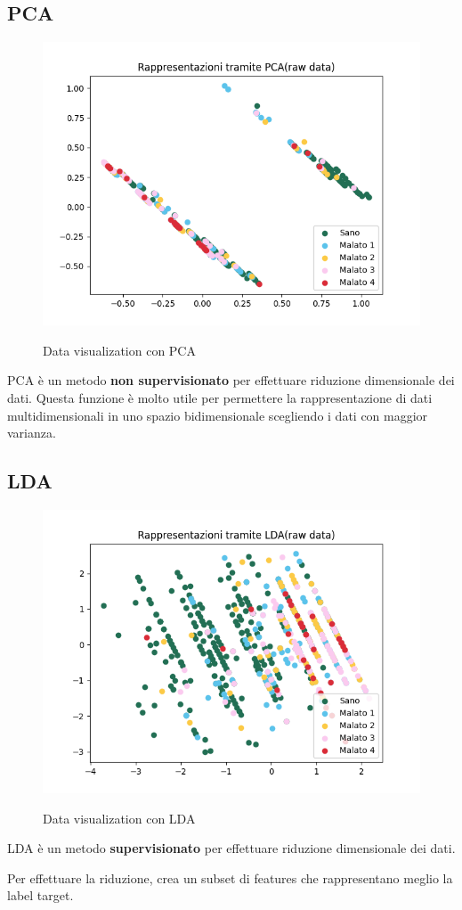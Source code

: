 \documentclass[a4paper]{article}
\begin{document}
    
    \clearpage
    
    \subsection{PCA}
    

    \begin{figure}[h!]
        \centering
            \includegraphics[width=0.5\linewidth]{imgs/pca.png}
        \label{fig:pca_data_visualization}
        \caption{Data visualization con PCA}
    \end{figure}
    PCA è un metodo \textbf{non supervisionato} per effettuare riduzione dimensionale dei dati.
    Questa funzione è molto utile per permettere la rappresentazione di dati multidimensionali
    in uno spazio bidimensionale scegliendo i dati con maggior varianza.

    
    \subsection{LDA}

    \begin{figure}[h!]
        \centering
            \includegraphics[width=0.5\linewidth]{imgs/lda.png}
        \label{fig:lda_data_visualization}
        \caption{Data visualization con LDA}
    \end{figure}

    LDA è un metodo \textbf{supervisionato} per effettuare riduzione dimensionale dei dati.

    Per effettuare la riduzione, crea un subset di features che rappresentano meglio la label target.
\end{document}
